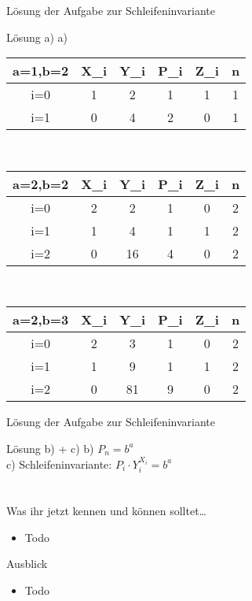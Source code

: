 \begin{frame}{Lösung der Aufgabe zur Schleifeninvariante}
	\begin{block}{Lösung a)}
	\small
	a)
		\begin{center}\begin{tabular}{C C C C C C}
			 	a=1,b=2&X_i&Y_i&P_i&Z_i&n\\
				\hline
				i=0&1&2&1&1&1\\
				i=1&0&4&2&0&1\\
			\end{tabular}\\[10pt]
		\begin{tabular}{C C C C C C}
			 	a=2,b=2&X_i&Y_i&P_i&Z_i&n\\
				\hline
				i=0&2&2&1&0&2\\
				i=1&1&4&1&1&2\\
				i=2&0&16&4&0&2\\
		\end{tabular}\\[10pt]
		\begin{tabular}{C C C C C C}
			 	a=2,b=3&X_i&Y_i&P_i&Z_i&n\\
				\hline
				i=0&2&3&1&0&2\\
				i=1&1&9&1&1&2\\
				i=2&0&81&9&0&2\\
			\end{tabular}\end{center}
	\end{block}
\end{frame}

\begin{frame}{Lösung der Aufgabe zur Schleifeninvariante}
	\begin{block}{Lösung b) + c)}
		b) $P_n = b^{a}$\\
		c) Schleifeninvariante: $P_i \cdot Y_{i}^{X_i} = b^{a}$
	\end{block}
\end{frame}
\section{}
	\begin{frame}{Was ihr jetzt kennen und können solltet\dots}
			\begin{itemize}
				\item Todo
			\end{itemize}
	
	\end{frame}
	\begin{frame}{Ausblick}
		\begin{itemize}
			\item Todo
		\end{itemize}
	\end{frame}
\section{}
\questionframe
\lastframe
{}
